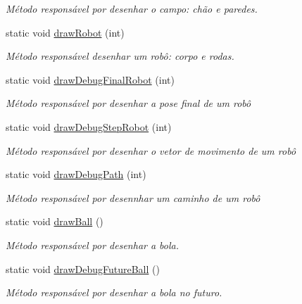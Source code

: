 \begin{DoxyCompactItemize}
\begin{DoxyCompactList}\small\item\em Método responsável por desenhar o campo\+: chão e paredes. \end{DoxyCompactList}\item 
static void \hyperlink{classGraphics_aea303675636309a511de1b2158cb1105}{draw\+Robot} (int)
\begin{DoxyCompactList}\small\item\em Método responsável desenhar um robô\+: corpo e rodas. \end{DoxyCompactList}\item 
static void \hyperlink{classGraphics_a9cb884049d4318fd4f0ee57f293d5281}{draw\+Debug\+Final\+Robot} (int)
\begin{DoxyCompactList}\small\item\em Método responsável por desenhar a pose final de um robô \end{DoxyCompactList}\item 
static void \hyperlink{classGraphics_a9109b4c601fa113e416842d1fb98cc33}{draw\+Debug\+Step\+Robot} (int)
\begin{DoxyCompactList}\small\item\em Método responsável por desenhar o vetor de movimento de um robô \end{DoxyCompactList}\item 
static void \hyperlink{classGraphics_a19c836249f27f13ae686f33819699047}{draw\+Debug\+Path} (int)
\begin{DoxyCompactList}\small\item\em Método responsável por desennhar um caminho de um robô \end{DoxyCompactList}\item 
static void \hyperlink{classGraphics_a8e0114e205ef00c6284ed40f14cea84a}{draw\+Ball} ()\hypertarget{classGraphics_a8e0114e205ef00c6284ed40f14cea84a}{}\label{classGraphics_a8e0114e205ef00c6284ed40f14cea84a}

\begin{DoxyCompactList}\small\item\em Método responsável por desenhar a bola. \end{DoxyCompactList}\item 
static void \hyperlink{classGraphics_a099efcc1425c088c977a405c5065fcd3}{draw\+Debug\+Future\+Ball} ()
\begin{DoxyCompactList}\small\item\em Método responsável por desenhar a bola no futuro. \end{DoxyCompactList}\end{DoxyCompactItemize}
